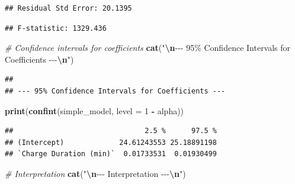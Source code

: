 \documentclass[
  12pt,
]{article}
\newenvironment{Shaded}{\begin{snugshade}}{\end{snugshade}}
\newcommand{\AttributeTok}[1]{\textcolor[rgb]{0.13,0.29,0.53}{#1}}
\newcommand{\CommentTok}[1]{\textcolor[rgb]{0.56,0.35,0.01}{\textit{#1}}}
\newcommand{\DecValTok}[1]{\textcolor[rgb]{0.00,0.00,0.81}{#1}}
\newcommand{\FunctionTok}[1]{\textcolor[rgb]{0.13,0.29,0.53}{\textbf{#1}}}
\newcommand{\NormalTok}[1]{#1}
\newcommand{\SpecialCharTok}[1]{\textcolor[rgb]{0.81,0.36,0.00}{\textbf{#1}}}
\newcommand{\StringTok}[1]{\textcolor[rgb]{0.31,0.60,0.02}{#1}}
\begin{document}
\begin{verbatim}
## Residual Std Error: 20.1395
\end{verbatim}

\begin{Shaded}
\end{Shaded}

\begin{verbatim}
## F-statistic: 1329.436
\end{verbatim}

\begin{Shaded}
\begin{Highlighting}[]
\CommentTok{\# Confidence intervals for coefficients}
\FunctionTok{cat}\NormalTok{(}\StringTok{"}\SpecialCharTok{\textbackslash{}n}\StringTok{{-}{-}{-} 95\% Confidence Intervals for Coefficients {-}{-}{-}}\SpecialCharTok{\textbackslash{}n}\StringTok{"}\NormalTok{)}
\end{Highlighting}
\end{Shaded}

\begin{verbatim}
## 
## --- 95% Confidence Intervals for Coefficients ---
\end{verbatim}

\begin{Shaded}
\begin{Highlighting}[]
\FunctionTok{print}\NormalTok{(}\FunctionTok{confint}\NormalTok{(simple\_model, }\AttributeTok{level =} \DecValTok{1} \SpecialCharTok{{-}}\NormalTok{ alpha))}
\end{Highlighting}
\end{Shaded}

\begin{verbatim}
##                               2.5 %      97.5 %
## (Intercept)             24.61243553 25.18891198
## `Charge Duration (min)`  0.01733531  0.01930499
\end{verbatim}

\begin{Shaded}
\begin{Highlighting}[]
\CommentTok{\# Interpretation}
\FunctionTok{cat}\NormalTok{(}\StringTok{"}\SpecialCharTok{\textbackslash{}n}\StringTok{{-}{-}{-} Interpretation {-}{-}{-}}\SpecialCharTok{\textbackslash{}n}\StringTok{"}\NormalTok{)}
\end{Highlighting}
\end{Shaded}
\end{document}
